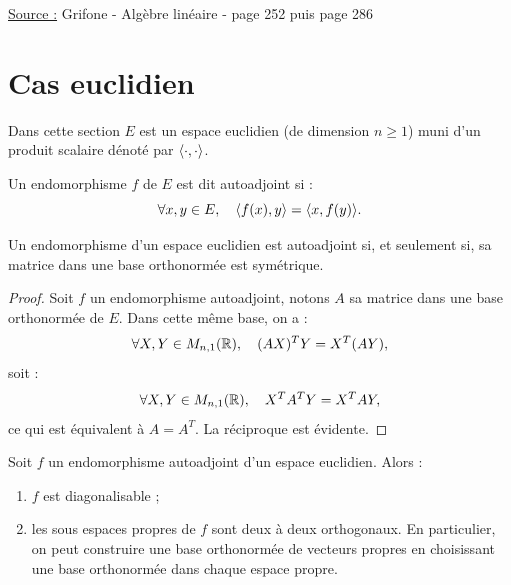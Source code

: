 

\pagestyle{fancy}

\fancyhead[C]{}
\fancyhead[R]{}



\underline{Source :} Grifone - Algèbre linéaire - page 252 puis page 286 

\section{Cas euclidien}

Dans cette section $E$ est un espace euclidien (de dimension $n \geq 1$) muni d'un produit scalaire dénoté par $\langle \cdot, \cdot\rangle$.

\begin{defn}
Un endomorphisme $f$ de $E$ est dit autoadjoint si :
\[ \forall x,y \in E, \quad \langle f(x), y\rangle = \langle x, f(y)\rangle . \]
\end{defn}

\begin{lem}
\label{lem:1}
Un endomorphisme d'un espace euclidien est autoadjoint si, et seulement si, sa matrice dans une base orthonormée est symétrique.
\end{lem}

\begin{proof}
Soit $f$ un endomorphisme autoadjoint, notons $A$ sa matrice dans une base orthonormée de $E$. 
Dans cette même base, on a :
\[ \forall X, Y \in M_{n,1}(\mathbb{R}), \quad (AX)^T Y = X^T (AY) , \]
soit :
\[ \forall X, Y \in M_{n,1}(\mathbb{R}), \quad X^TA^T Y = X^T AY , \]
ce qui est équivalent à $A = A^T$. 
La réciproque est évidente. 
\end{proof}

\begin{thm}
Soit $f$ un endomorphisme autoadjoint d'un espace euclidien. Alors :
\begin{enumerate}[label=(\roman*)]
\item $f$ est diagonalisable ;
\item les sous espaces propres de $f$ sont deux à deux orthogonaux. En particulier, on peut construire une base orthonormée 
de vecteurs propres en choisissant une base orthonormée dans chaque espace propre.
\end{enumerate}
\end{thm}

